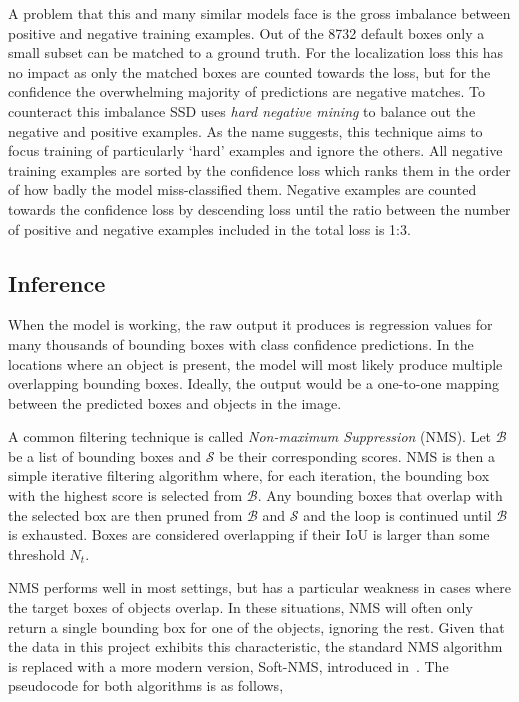 A problem that this and many similar models face is the gross imbalance between positive and negative training examples.
Out of the 8732 default boxes only a small subset can be matched to a ground truth.
For the localization loss this has no impact as only the matched boxes are counted towards the loss, but for the confidence the overwhelming majority of predictions are negative matches.
To counteract this imbalance SSD uses \textit{hard negative mining} to balance out the negative and positive examples.
As the name suggests, this technique aims to focus training of particularly `hard' examples and ignore the others.
All negative training examples are sorted by the confidence loss which ranks them in the order of how badly the model miss-classified them.
Negative examples are counted towards the confidence loss by descending loss until the ratio between the number of positive and negative examples included in the total loss is 1:3.

\subsection{Inference}

When the model is working, the raw output it produces is regression values for many thousands of bounding boxes with class confidence predictions.
In the locations where an object is present, the model will most likely produce multiple overlapping bounding boxes.
Ideally, the output would be a one-to-one mapping between the predicted boxes and objects in the image.

A common filtering technique is called \textit{Non-maximum Suppression} (NMS).
Let \( \mathcal{B} \) be a list of bounding boxes and \( \mathcal{S} \) be their corresponding scores.
NMS is then a simple iterative filtering algorithm where, for each iteration, the bounding box with the highest score is selected from \(\mathcal{B}\).
Any bounding boxes that overlap with the selected box are then pruned from \(\mathcal{B}\) and \(\mathcal{S}\) and the loop is continued until \(\mathcal{B}\) is exhausted.
Boxes are considered overlapping if their IoU is larger than some threshold \(N_t\).

NMS performs well in most settings, but has a particular weakness in cases where the target boxes of objects overlap.
In these situations, NMS will often only return a single bounding box for one of the objects, ignoring the rest.
Given that the data in this project exhibits this characteristic, the standard NMS algorithm is replaced with a more modern version, Soft-NMS, introduced in\ \textcite{bodla2017softnms}.
The pseudocode for both algorithms is as follows,

